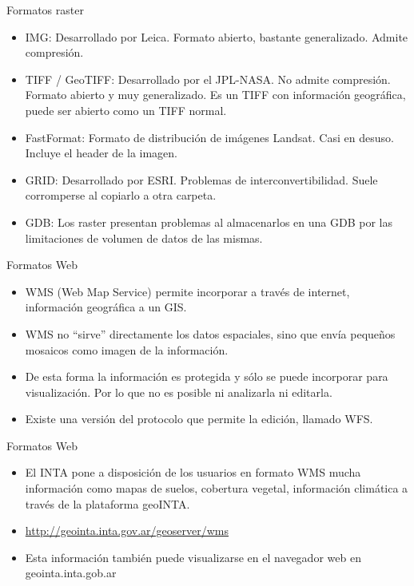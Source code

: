 \documentclass{beamer}
\begin{document}
\begin{frame}{Formatos raster}
	\begin{itemize}[<+->]
		\item IMG: Desarrollado por Leica. Formato abierto, bastante generalizado. Admite compresión.
		\item TIFF / GeoTIFF: Desarrollado por el JPL-NASA. No admite compresión. Formato abierto y muy generalizado. Es un TIFF con información geográfica, puede ser abierto como un TIFF normal. 
		\item FastFormat: Formato de distribución de imágenes Landsat. Casi en desuso. Incluye el header de la imagen.
		\item GRID: Desarrollado por ESRI. Problemas de interconvertibilidad. Suele corromperse al copiarlo a otra carpeta.
		\item GDB: Los raster presentan problemas al almacenarlos en una GDB por las limitaciones de volumen de datos de las mismas.
	\end{itemize}
\end{frame}

\begin{frame}{Formatos Web}
	\begin{itemize}[<+->]
		\item WMS (Web Map Service) permite incorporar a través de internet, información geográfica a un GIS. 
		\item WMS no “sirve” directamente los datos espaciales, sino que envía pequeños mosaicos como imagen de la información.
		\item De esta forma la información es protegida y sólo se puede incorporar para visualización. Por lo que no es posible ni analizarla ni editarla.
		\item Existe una versión del protocolo que permite la edición, llamado WFS.  
	\end{itemize}
\end{frame}

\begin{frame}{Formatos Web}
	\begin{itemize}[<+->]
		\item El INTA pone a disposición de los usuarios en formato WMS mucha información como mapas de suelos, cobertura vegetal, información climática a través de la plataforma geoINTA.
		\item \url{http://geointa.inta.gov.ar/geoserver/wms}
		\item Esta información también puede visualizarse en el navegador web en geointa.inta.gob.ar
	\end{itemize}
\end{frame}
\end{document}
